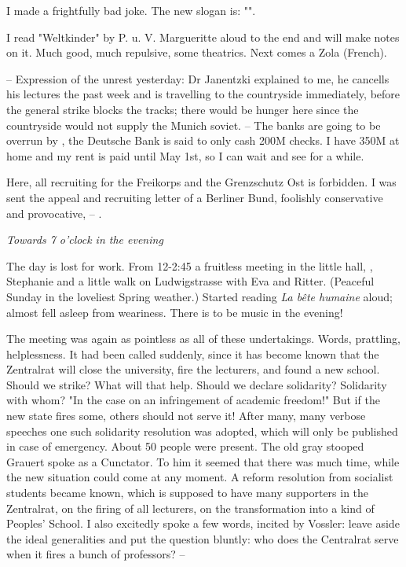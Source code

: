 I made a frightfully bad joke. The new slogan is: "".

I read "Weltkinder" by P. u. V. Margueritte aloud to the end and will make notes on it. Much good, much repulsive, some theatrics. Next comes a Zola (French).

-- Expression of the unrest yesterday: Dr Janentzki explained to me, he cancells his lectures the past week and is travelling to the countryside immediately, before the general strike blocks the tracks; there would be hunger here since the countryside would not supply the Munich soviet. -- The banks are going to be overrun by , the Deutsche Bank is said to only cash 200M checks. I have 350M at home and my rent is paid until May 1st, so I can wait and see for a while.

Here, all recruiting for the Freikorps and the Grenzschutz Ost is forbidden. I was sent the appeal and recruiting letter of a Berliner Bund, foolishly conservative and provocative,  -- .

\textit{Towards 7 o'clock in the evening}

The day is lost for work. From 12-2:45 a fruitless meeting in the little hall, , Stephanie and a little walk on Ludwigstrasse with Eva and Ritter. (Peaceful Sunday in the loveliest Spring weather.) Started reading \textit{La bête humaine} aloud; almost fell asleep from weariness. There is to be music in the evening!

The meeting was again as pointless as all of these undertakings. Words, prattling, helplessness. It had been called suddenly, since it has become known that the Zentralrat will close the university, fire the lecturers, and found a new school. Should we strike? What will that help. Should we declare solidarity? Solidarity with whom? "In the case on an infringement of academic freedom!" But if the new state fires some, others should not serve it! After many, many verbose speeches one such solidarity resolution was adopted, which will only be published in case of emergency. About 50 people were present. The old gray stooped Grauert spoke as a Cunctator. To him it seemed that there was much time, while the new situation could come at any moment. A reform resolution from socialist students became known, which is supposed to have many supporters in the Zentralrat, on the firing of all lecturers, on the transformation into a kind of Peoples' School. I also excitedly spoke a few words, incited by Vossler: leave aside the ideal generalities and put the question bluntly: who does the Centralrat serve when it fires a bunch of professors? --

